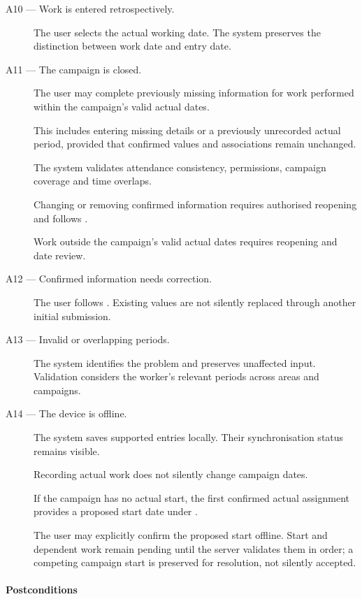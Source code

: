 \begin{description}
    \item[A10 --- Work is entered retrospectively.]
    The user selects the actual working date.
    The system preserves the distinction
    between work date and entry date.

    \item[A11 --- The campaign is closed.]

    The user may complete previously missing information
    for work performed within the campaign's valid actual dates.

    This includes entering missing details or a previously
    unrecorded actual period, provided that confirmed values
    and associations remain unchanged.

    The system validates attendance consistency, permissions,
    campaign coverage and time overlaps.

    Changing or removing confirmed information requires
    authorised reopening and follows .

    Work outside the campaign's valid actual dates requires
    reopening and date review.

    \item[A12 --- Confirmed information needs correction.]
    The user follows .
    Existing values are not silently replaced
    through another initial submission.

    \item[A13 --- Invalid or overlapping periods.]
    The system identifies the problem
    and preserves unaffected input.
    Validation considers the worker's relevant
    periods across areas and campaigns.

    \item[A14 --- The device is offline.]
    The system saves supported entries locally.
    Their synchronisation status remains visible.

    Recording actual work does not silently change campaign dates.

    If the campaign has no actual start, the first confirmed
    actual assignment provides a proposed start date under .

    The user may explicitly confirm the proposed start offline. Start and
    dependent work remain pending until the server validates them in order;
    a competing campaign start is preserved for resolution, not silently accepted.
\end{description}

\paragraph{Postconditions}

